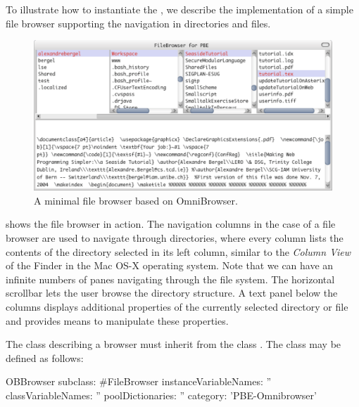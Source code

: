 \documentclass[a4paper,10pt,twoside]{book}
\begin{document}

To illustrate how to instantiate the \obf, we describe the implementation of a simple file browser supporting the navigation in directories and files.

\begin{figure}[!ht]
\begin{center}
\includegraphics[scale=0.34]{filebrowser}
\caption{A minimal file browser based on OmniBrowser.} \label{fig:filebrowser}
\end{center}
\end{figure}

 shows the file browser in action. The navigation columns in the case of a file browser are used to navigate through directories, where every column lists the contents of the directory selected in its left column, similar to the \emph{Column View} of the Finder in the Mac OS-X operating system.
Note that we can have an infinite numbers of panes navigating through the file system. The horizontal scrollbar lets the user browse the directory structure. A text panel below the columns displays additional properties of the currently selected directory or file and provides means to manipulate these properties.

The class describing a browser must inherit from the class . The class  may be defined as follows:

\begin{code}{}
OBBrowser subclass: #FileBrowser
	instanceVariableNames: ''
	classVariableNames: ''
	poolDictionaries: ''
	category: 'PBE-Omnibrowser'
\end{code}
\end{document}
